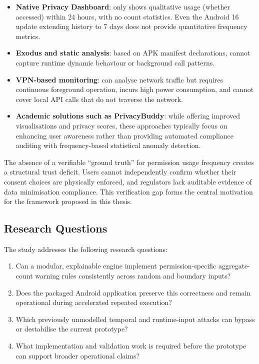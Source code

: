 \begin{itemize}
\item \textbf{Native Privacy Dashboard}: only shows qualitative usage (whether accessed) within 24 hours, with no count statistics. Even the Android 16 update extending history to 7 days does not provide quantitative frequency metrics.
\item \textbf{Exodus and static analysis}: based on APK manifest declarations, cannot capture runtime dynamic behaviour or background call patterns.
\item \textbf{VPN-based monitoring}: can analyse network traffic but requires continuous foreground operation, incurs high power consumption, and cannot cover local API calls that do not traverse the network.
\item \textbf{Academic solutions such as PrivacyBuddy}: while offering improved visualisations and privacy scores, these approaches typically focus on enhancing user awareness rather than providing automated compliance auditing with frequency-based statistical anomaly detection.
\end{itemize}

The absence of a verifiable ``ground truth'' for permission usage frequency creates a structural trust deficit. Users cannot independently confirm whether their consent choices are physically enforced, and regulators lack auditable evidence of data minimisation compliance. This verification gap forms the central motivation for the framework proposed in this thesis.

\subsection{Research Questions}

The study addresses the following research questions:

\begin{enumerate}
    \item Can a modular, explainable engine implement permission-specific aggregate-count warning rules consistently across random and boundary inputs?
    \item Does the packaged Android application preserve this correctness and remain operational during accelerated repeated execution?
    \item Which previously unmodelled temporal and runtime-input attacks can bypass or destabilise the current prototype?
    \item What implementation and validation work is required before the prototype can support broader operational claims?
\end{enumerate}

